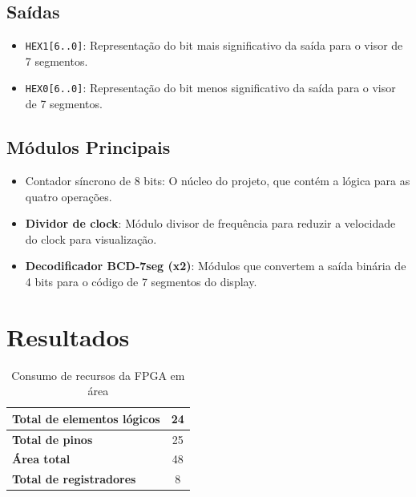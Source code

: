 \documentclass[12pt, fleqn]{article}
\begin{document}
\subsection{Saídas}

\begin{itemize}
    \item \texttt{HEX1[6..0]}:\hspace{3pt} Representação do bit mais significativo da saída para o visor de 7 segmentos.
    \item \texttt{HEX0[6..0]}:\hspace{3pt} Representação do bit menos significativo da saída para o visor de 7 segmentos.
\end{itemize}

\subsection{Módulos Principais}

\begin{itemize}
    \item \textbf{}{Contador síncrono de 8 bits}: O núcleo do projeto, que contém a lógica para as quatro operações.
    \item \textbf{Dividor de clock}: Módulo divisor de frequência para reduzir a velocidade do clock para visualização.
    \item \textbf{Decodificador BCD-7seg (x2)}: Módulos que convertem a saída binária de 4 bits para o código de 7 segmentos do display.
\end{itemize}


\section{Resultados}

\begin{table}[H]
    \centering
    \begin{tabular}{|l | c|}
        \hline
        \textbf{Total de elementos lógicos} & 24 \\
        \hline
        \textbf{Total de pinos} & 25 \\
        \hline
        \textbf{Área total} & 48 \\
        \hline
        \textbf{Total de registradores} & 8 \\
        \hline
    \end{tabular}
    \caption{Consumo de recursos da FPGA em área}
\end{table}
\end{document}
